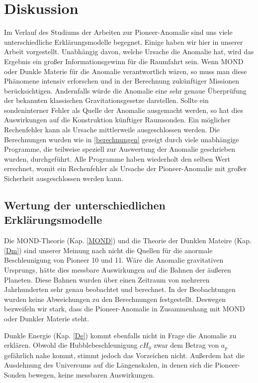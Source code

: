 \section{Diskussion}

Im Verlauf des Studiums der Arbeiten zur Pioneer-Anomalie sind uns viele unterschiedliche Erklärungsmodelle begegnet. Einige haben wir hier in unserer Arbeit vorgestellt. Unabhängig davon, welche Ursache die Anomalie hat, wird das Ergebnis ein großer Informationsgewinn für die Raumfahrt sein. Wenn MOND oder Dunkle Materie für die Anomalie verantwortlich wären, so muss man diese Phänomene intensiv erforschen und in der Berechnung zukünftiger Missionen berücksichtigen. Andernfalls würde die Anomalie eine sehr genaue Überprüfung der bekannten klassischen Gravitationsgesetze darstellen. Sollte ein sondeninterner Fehler als Quelle der Anomalie ausgemacht werden, so hat dies Auswirkungen auf die Konstruktion künftiger Raumsonden. Ein möglicher Rechenfehler kann als Ursache mittlerweile ausgeschlossen werden. Die Berechnungen wurden wie in \ref{berechnungen} gezeigt durch viele unabhängige Programme, die teilweise speziell zur Auswertung der Anomalie geschrieben wurden, durchgeführt. Alle Programme haben wiederholt den selben Wert errechnet, womit ein Rechenfehler als Ursache der Pioneer-Anomalie mit großer Sicherheit ausgeschlossen werden kann.

\bigskip

\subsection{Wertung der unterschiedlichen Erklärungsmodelle}
Die MOND-Theorie (Kap. \ref{MOND}) und die Theorie der Dunklen Mateire (Kap. \ref{Dm}) sind unserer Meinung nach nicht die Quellen für die anormale Beschleunigung von Pioneer 10 und 11. Wäre die Anomalie gravitativen Ursprungs, hätte dies messbare Auswirkungen auf die Bahnen der äußeren Planeten. Diese Bahnen wurden über einen Zeitraum von mehreren Jahrhunderten sehr genau beobachtet und berechnet. In der Beobachtungen wurden keine Abweichungen zu den Berechnungen festgestellt. Deswegen bezweifeln wir stark, dass die Pioneer-Anomalie in Zusammenhang mit MOND oder Dunkler Materie steht.

\bigskip

Dunkle Energie (Kap. \ref{De}) kommt ebenfalls nicht in Frage die Anomalie zu erklären. Obwohl die Hubblebeschleunigung $cH_0$ zwar dem Betrag von $a_p$ gefährlich nahe kommt, stimmt jedoch das Vorzeichen nicht. Außerdem hat die Ausdehnung des Universums auf die Längenskalen, in denen sich die Pioneer-Sonden bewegen, keine messbaren Auswirkungen.

